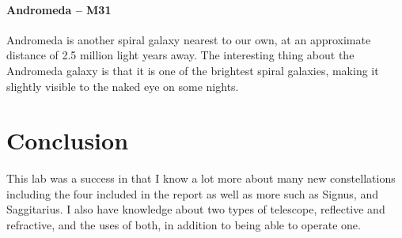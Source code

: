 \documentclass{article}
\begin{document}
\paragraph{Andromeda -- M31}
Andromeda is another spiral galaxy nearest to our own, at an approximate distance of 2.5 million light years away.  The interesting thing about the Andromeda galaxy is that it is one of the brightest spiral galaxies, making it slightly visible to the naked eye on some nights.  
\section{Conclusion}
This lab was a success in that I know a lot more about many new constellations including the four included in the report as well as more such as Signus, and Saggitarius.  I also have knowledge about two types of telescope, reflective and refractive, and the uses of both, in addition to being able to operate one.  


\end{document}
